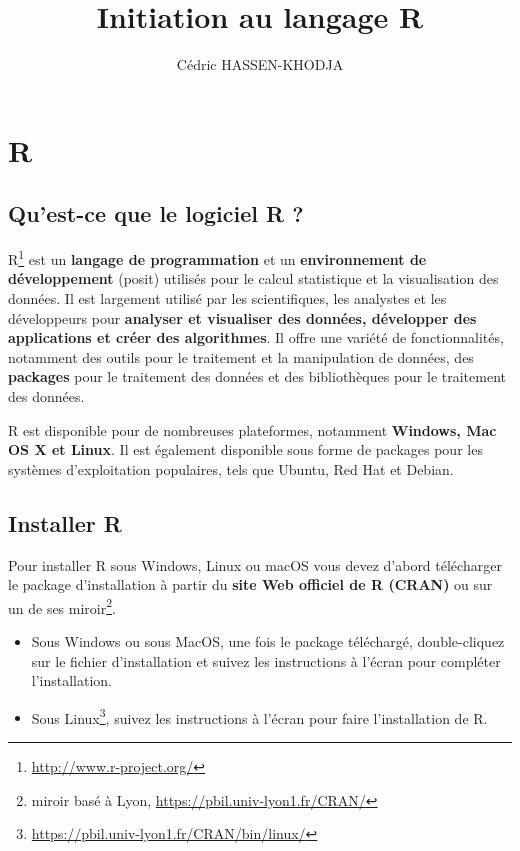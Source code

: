 \documentclass[
]{article}
\title{Initiation au langage R}
\author{Cédric HASSEN-KHODJA}
\date{}
\providecommand{\tightlist}{%
  \setlength{\itemsep}{0pt}\setlength{\parskip}{0pt}}
\begin{document}
\maketitle

{
\setcounter{tocdepth}{2}
\tableofcontents
}
\hypertarget{r}{%
\section{R}\label{r}}

\hypertarget{quest-ce-que-le-logiciel-r}{%
\subsection{Qu'est-ce que le logiciel R ?}\label{quest-ce-que-le-logiciel-r}}

R\footnote{\url{http://www.r-project.org/}} est un \textbf{langage de programmation} et un \textbf{environnement de développement} (posit)
utilisés pour le calcul statistique et la visualisation des données. Il est largement
utilisé par les scientifiques, les analystes et les développeurs pour \textbf{analyser et visualiser des données, développer des applications et créer des algorithmes}.
Il offre une variété de fonctionnalités, notamment des outils pour le traitement
et la manipulation de données, des \textbf{packages} pour le traitement des données et des bibliothèques pour le traitement des données.

R est disponible pour de nombreuses plateformes, notamment \textbf{Windows, Mac OS X et Linux}.
Il est également disponible sous forme de packages pour les systèmes d'exploitation populaires, tels que Ubuntu, Red Hat et Debian.

\hypertarget{installer-r}{%
\subsection{Installer R}\label{installer-r}}

Pour installer R sous Windows, Linux ou macOS vous devez d'abord télécharger le package d'installation à partir du \textbf{site Web officiel de R (CRAN)} ou sur un de ses miroir\footnote{miroir basé à Lyon, \url{https://pbil.univ-lyon1.fr/CRAN/}}.\\

\begin{itemize}
\tightlist
\item
  Sous Windows ou sous MacOS, une fois le package téléchargé, double-cliquez sur le fichier d'installation et suivez les instructions à l'écran pour compléter l'installation.\\
\item
  Sous Linux\footnote{\url{https://pbil.univ-lyon1.fr/CRAN/bin/linux/}}, suivez les instructions à l'écran pour faire l'installation de R.
\end{itemize}
\end{document}
